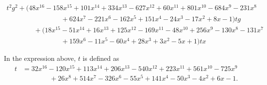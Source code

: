 \documentclass[12pt,twoside]{memoir}
\begin{document}
      {\footnotesize
      \begin{align*}
      t^2g^2 + (48x^{16}-158x^{15}+101x^{14}+334x^{13}-627x^{12}+60x^{11}+801x^{10}-684x^9-231x^8\\
      \qquad\qquad\qquad\qquad +624x^7-221x^6-162x^5+151x^4-24x^3-17x^2+8x-1)tg \\
      \qquad\qquad +(18x^{15}-51x^{14}+16x^{13}+125x^{12}-169x^{11}-48x^{10}+256x^9-130x^8-131x^7\\
      \qquad\qquad\qquad\qquad +159x^6-11x^5-60x^4+28x^3+3x^2-5x+1)tx
      \end{align*}

    
      In the expression above, $t$ is defined as 
      \begin{align*}
        t &= 32x^{16}-120x^{15}+113x^{14}+206x^{13}-540x^{12}+223x^{11}+561x^{10}-725x^9\\
        &\qquad\qquad +26x^8+514x^7-326x^6-55x^5+141x^4-50x^3-4x^2+6x-1.
      \end{align*}
      }
\end{document}
